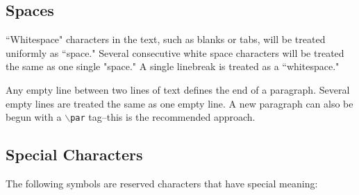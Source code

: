 \documentclass[11pt]{article}
\begin{document}



\subsection{Spaces}

``Whitespace" characters in the text, such as blanks or tabs, will be
treated uniformly as ``space." Several consecutive white space
characters will be treated the same as one single "space." A single
linebreak is treated as a ``whitespace."

Any empty line between two lines of text defines the end of a
paragraph. Several empty lines are treated the same as one empty
line. A new paragraph can also be begun with a {\tt $\backslash$par}
tag--this is the recommended approach.








\newpage

\subsection{Special Characters}

The following symbols are reserved characters that have special
meaning:
\end{document}
